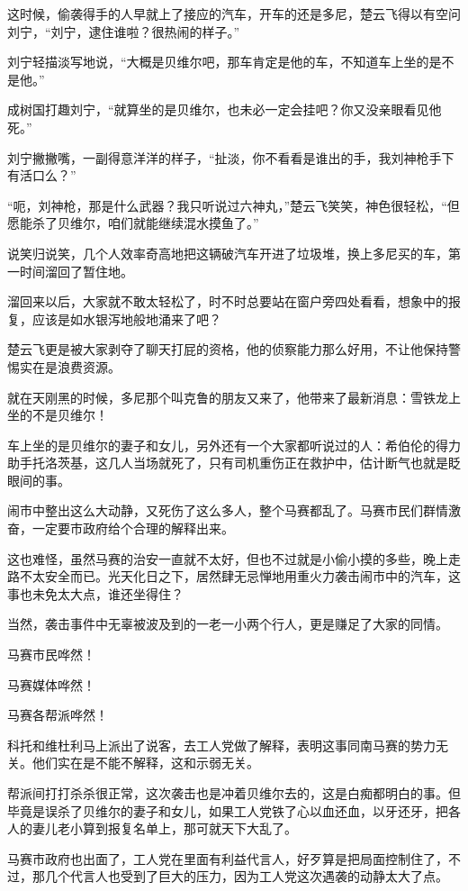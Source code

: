 这时候，偷袭得手的人早就上了接应的汽车，开车的还是多尼，楚云飞得以有空问刘宁，“刘宁，逮住谁啦？很热闹的样子。”

刘宁轻描淡写地说，“大概是贝维尔吧，那车肯定是他的车，不知道车上坐的是不是他。”

成树国打趣刘宁，“就算坐的是贝维尔，也未必一定会挂吧？你又没亲眼看见他死。”

刘宁撇撇嘴，一副得意洋洋的样子，“扯淡，你不看看是谁出的手，我刘神枪手下有活口么？”

“呃，刘神枪，那是什么武器？我只听说过六神丸，”楚云飞笑笑，神色很轻松，“但愿能杀了贝维尔，咱们就能继续混水摸鱼了。”

说笑归说笑，几个人效率奇高地把这辆破汽车开进了垃圾堆，换上多尼买的车，第一时间溜回了暂住地。

溜回来以后，大家就不敢太轻松了，时不时总要站在窗户旁四处看看，想象中的报复，应该是如水银泻地般地涌来了吧？

楚云飞更是被大家剥夺了聊天打屁的资格，他的侦察能力那么好用，不让他保持警惕实在是浪费资源。

就在天刚黑的时候，多尼那个叫克鲁的朋友又来了，他带来了最新消息：雪铁龙上坐的不是贝维尔！

车上坐的是贝维尔的妻子和女儿，另外还有一个大家都听说过的人：希伯伦的得力助手托洛茨基，这几人当场就死了，只有司机重伤正在救护中，估计断气也就是眨眼间的事。

闹市中整出这么大动静，又死伤了这么多人，整个马赛都乱了。马赛市民们群情激奋，一定要市政府给个合理的解释出来。

这也难怪，虽然马赛的治安一直就不太好，但也不过就是小偷小摸的多些，晚上走路不太安全而已。光天化日之下，居然肆无忌惮地用重火力袭击闹市中的汽车，这事也未免太大点，谁还坐得住？

当然，袭击事件中无辜被波及到的一老一小两个行人，更是赚足了大家的同情。

马赛市民哗然！

马赛媒体哗然！

马赛各帮派哗然！

科托和维杜利马上派出了说客，去工人党做了解释，表明这事同南马赛的势力无关。他们实在是不能不解释，这和示弱无关。

帮派间打打杀杀很正常，这次袭击也是冲着贝维尔去的，这是白痴都明白的事。但毕竟是误杀了贝维尔的妻子和女儿，如果工人党铁了心以血还血，以牙还牙，把各人的妻儿老小算到报复名单上，那可就天下大乱了。

马赛市政府也出面了，工人党在里面有利益代言人，好歹算是把局面控制住了，不过，那几个代言人也受到了巨大的压力，因为工人党这次遇袭的动静太大了点。

